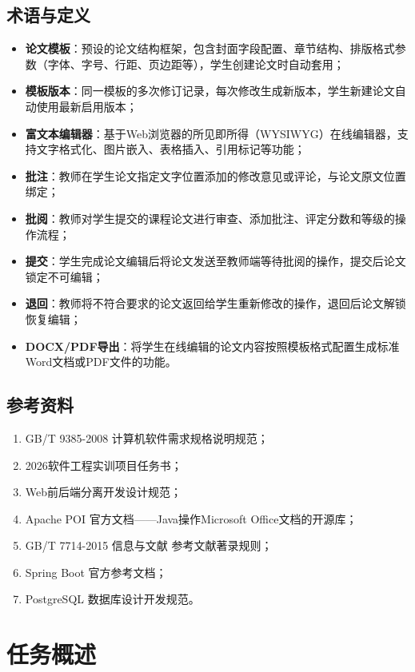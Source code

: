 \documentclass{../softeng}
\begin{document}
\subsection{术语与定义}

\begin{itemize}
    \item \textbf{论文模板}：预设的论文结构框架，包含封面字段配置、章节结构、排版格式参数（字体、字号、行距、页边距等），学生创建论文时自动套用；
    \item \textbf{模板版本}：同一模板的多次修订记录，每次修改生成新版本，学生新建论文自动使用最新启用版本；
    \item \textbf{富文本编辑器}：基于Web浏览器的所见即所得（WYSIWYG）在线编辑器，支持文字格式化、图片嵌入、表格插入、引用标记等功能；
    \item \textbf{批注}：教师在学生论文指定文字位置添加的修改意见或评论，与论文原文位置绑定；
    \item \textbf{批阅}：教师对学生提交的课程论文进行审查、添加批注、评定分数和等级的操作流程；
    \item \textbf{提交}：学生完成论文编辑后将论文发送至教师端等待批阅的操作，提交后论文锁定不可编辑；
    \item \textbf{退回}：教师将不符合要求的论文返回给学生重新修改的操作，退回后论文解锁恢复编辑；
    \item \textbf{DOCX/PDF导出}：将学生在线编辑的论文内容按照模板格式配置生成标准Word文档或PDF文件的功能。
\end{itemize}

\subsection{参考资料}

\begin{enumerate}
    \item GB/T 9385-2008 计算机软件需求规格说明规范；
    \item 2026软件工程实训项目任务书；
    \item Web前后端分离开发设计规范；
    \item Apache POI 官方文档——Java操作Microsoft Office文档的开源库；
    \item GB/T 7714-2015 信息与文献 参考文献著录规则；
    \item Spring Boot 官方参考文档；
    \item PostgreSQL 数据库设计开发规范。
\end{enumerate}

\section{任务概述}
\end{document}
